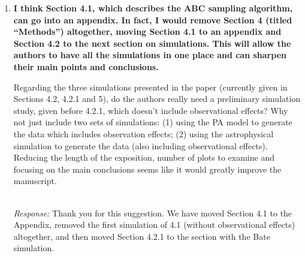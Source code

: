 \documentclass[11pt, oneside]{article}   	%
\newcommand{\jessi}[1]{{\color{blue}[[\textbf{Jessi: }#1]]}}
\newcommand{\chad}[1]{{\color{cyan}[[\textbf{Chad: }#1]]}}
\begin{document}
\begin{enumerate}
\item {\bf I think Section 4.1, which describes the ABC sampling algorithm, can go into an appendix. In fact, I would remove Section 4 (titled ``Methods'') altogether, moving Section 4.1 to an appendix and Section 4.2 to the next section on simulations. This will allow the authors to have all the simulations in one place and can sharpen their main points and conclusions.

Regarding the three simulations presented in the paper (currently given in Sections 4.2, 4.2.1 and 5), do the authors really need a preliminary simulation study, given before 4.2.1, which doesn't include observational effects? Why not just include two sets of simulations: (1) using the PA model to generate the data which includes observation effects; (2) using the astrophysical simulation to generate the data (also including observational effects). Reducing the length of the exposition, number of plots to examine and focusing on the main conclusions seems like it would greatly improve the manuscript.
}\\
\noindent \emph{Response:} Thank you for this suggestion.  We have moved Section 4.1 to the Appendix, removed the first simulation of 4.1 (without observational effects) altogether, and then moved Section 4.2.1 to the section with the Bate simulation.  
\bigskip
\end{enumerate}
\end{document}
